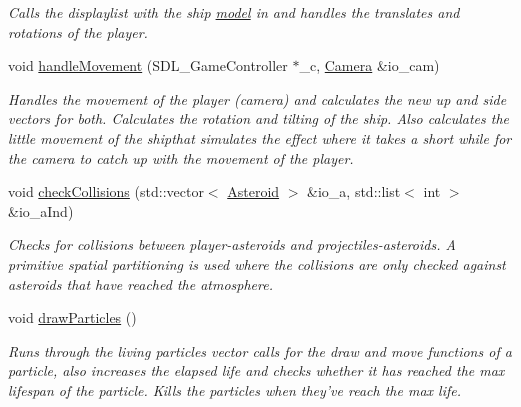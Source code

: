 \begin{DoxyCompactItemize}
\begin{DoxyCompactList}\small\item\em Calls the displaylist with the ship \hyperlink{structmodel}{model} in and handles the translates and rotations of the player. \item\end{DoxyCompactList}\item 
void \hyperlink{classPlayer_a118b1baca4ab10f79d2bbbde90a9444e}{handleMovement} (SDL\_\-GameController $\ast$\_\-c, \hyperlink{classCamera}{Camera} \&io\_\-cam)
\begin{DoxyCompactList}\small\item\em Handles the movement of the player (camera) and calculates the new up and side vectors for both. Calculates the rotation and tilting of the ship. Also calculates the little movement of the shipthat simulates the effect where it takes a short while for the camera to catch up with the movement of the player. \item\end{DoxyCompactList}\item 
void \hyperlink{classPlayer_aadb3a7621f71cc1be367442b11912cb5}{checkCollisions} (std::vector$<$ \hyperlink{classAsteroid}{Asteroid} $>$ \&io\_\-a, std::list$<$ int $>$ \&io\_\-aInd)
\begin{DoxyCompactList}\small\item\em Checks for collisions between player-\/asteroids and projectiles-\/asteroids. A primitive spatial partitioning is used where the collisions are only checked against asteroids that have reached the atmosphere. \item\end{DoxyCompactList}\item 
\hypertarget{classPlayer_ae4cd641661b40418d556205b4dc6c2d6}{
void \hyperlink{classPlayer_ae4cd641661b40418d556205b4dc6c2d6}{drawParticles} ()}
\label{classPlayer_ae4cd641661b40418d556205b4dc6c2d6}

\begin{DoxyCompactList}\small\item\em Runs through the living particles vector calls for the draw and move functions of a particle, also increases the elapsed life and checks whether it has reached the max lifespan of the particle. Kills the particles when they've reach the max life. \item\end{DoxyCompactList}\end{DoxyCompactItemize}
